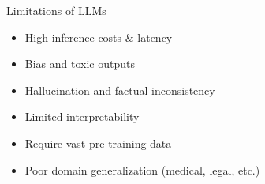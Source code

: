 \begin{frame}{Limitations of LLMs}
  \begin{itemize}
    \item[\textcolor{red}{$\blacktriangleright$}] High inference costs \& latency
    \item[\textcolor{red}{$\blacktriangleright$}] Bias and toxic outputs
    \item[\textcolor{red}{$\blacktriangleright$}] Hallucination and factual inconsistency
    \item[\textcolor{red}{$\blacktriangleright$}] Limited interpretability
    \item[\textcolor{red}{$\blacktriangleright$}] Require vast pre-training data
    \item[\textcolor{red}{$\blacktriangleright$}] Poor domain generalization (medical, legal, etc.)
  \end{itemize}
\end{frame}
